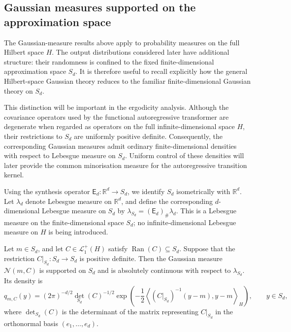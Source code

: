 \subsection{Gaussian measures supported on the approximation space}
\label{subsec:Gaussian measures supported on the approximation space}

The Gaussian-measure results above apply to probability measures on the full Hilbert space \(H\). The output distributions considered later have additional structure: their randomness is confined to the fixed finite-dimensional approximation space \(S_d\). It is therefore useful to recall explicitly how the general Hilbert-space Gaussian theory reduces to the familiar finite-dimensional Gaussian theory on \(S_d\).

This distinction will be important in the ergodicity analysis. Although the covariance operators used by the functional autoregressive transformer are degenerate when regarded as operators on the full infinite-dimensional space \(H\), their restrictions to \(S_d\) are uniformly positive definite. Consequently, the corresponding Gaussian measures admit ordinary finite-dimensional densities with respect to Lebesgue measure on \(S_d\). Uniform control of these densities will later provide the common minorisation measure for the autoregressive transition kernel.

Using the synthesis operator \(\mathsf E_d:\mathbb R^d\to S_d\), we identify \(S_d\) isometrically with \(\mathbb R^d\). Let \(\lambda_d\) denote Lebesgue measure on \(\mathbb R^d\), and define the corresponding \(d\)-dimensional Lebesgue measure on \(S_d\) by
\(
\lambda_{S_d}=(\mathsf E_d)_\#\lambda_d.
\)
This is a Lebesgue measure on the finite-dimensional space \(S_d\); no infinite-dimensional Lebesgue measure on \(H\) is being introduced.

\begin{proposition}
\label{prop:Gaussian density on the approximation space}
Let \(m\in S_d\), and let \(C\in\mathcal L_1^+(H)\) satisfy \(\operatorname{Ran}(C)\subseteq S_d\). Suppose that the restriction \(C|_{S_d}:S_d\to S_d\) is positive definite. Then the Gaussian measure \(\mathcal N(m,C)\) is supported on \(S_d\) and is absolutely continuous with respect to \(\lambda_{S_d}\). Its density is
\[
q_{m,C}(y)
=
(2\pi)^{-d/2}
\textstyle
\det_{S_d}(C)^{-1/2}
\exp\left(
-\frac12
\left\langle
(C|_{S_d})^{-1}(y-m),y-m
\right\rangle_H
\right),
\qquad y\in S_d,
\]
where \(\det_{S_d}(C)\) is the determinant of the matrix representing \(C|_{S_d}\) in the orthonormal basis \((e_1,\ldots,e_d)\).
\end{proposition}


